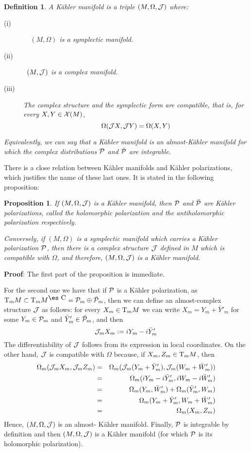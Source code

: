 \documentclass[12pt]{article}
\newtheorem{prop}{Proposition}
\newtheorem{definition}{Definition}
\def\beann{\begin{eqnarray*}}
\def\eeann{\end{eqnarray*}}
\def\qed{\ifvmode\removelastskip\fi
{\unskip\nobreak\hfil\penalty50\hbox{}\nobreak\hfil
\hbox{\vrule height1.2ex width1.2ex}\parfillskip=0pt
\finalhyphendemerits=0 \par\smallskip}}
\def\P{{\cal P}}
\def\Complex{\mbox{\es C}}
\def\Tan{{\rm T}}
\begin{document}
\begin{definition}
A {\rm K\"ahler manifold} is a triple $(M,\Omega ,{\cal J})$ where:
\begin{description}
\item[{\rm (i)}]\ \
$(M,\Omega )$ is a symplectic manifold.
\item[{\rm (ii)}]\
$(M,{\cal J})$ is a complex manifold.
\item[{\rm (iii)}]
The complex structure and the symplectic form
are compatible, that is, for every $X,Y \in {\cal X}(M)$,
$$
\Omega ({\cal J}X,{\cal J}Y) =  \Omega (X,Y)
$$
\end{description}

Equivalently, we can say that a K\"ahler manifold
is an almost-K\"ahler manifold for which
the complex distributions $\P$ and $\bar \P$ are integrable.
\end{definition}

There is a close relation between K\"ahler manifolds
and K\"ahler polarizations,
which justifies the name of these last ones.
It is stated in the following proposition:

\begin{prop}
If $(M,\Omega ,{\cal J})$ is a K\"ahler manifold,
then $\P$ and $\bar \P$ are K\"ahler polarizations,
called the {\rm holomorphic polarization} and
the {\rm antiholomorphic polarization} respectively.

Conversely, if $(M,\Omega)$ is a symplectic manifold
which carries a K\"ahler polarization $\P$,
then there is a complex structure ${\cal J}$ defined in $M$
which is compatible with $\Omega$,
and therefore, $(M,\Omega ,{\cal J})$ is a K\"ahler manifold.
\end{prop}
{\bf Proof}: 
The first part of the proposition is immediate.

For the second one we have that
if $\P$ is a K\"ahler polarization, as
$\Tan_mM \subset \Tan_m M^{\Complex} = \P_m \oplus \bar \P_m$,
then we can define an almost-complex structure ${\cal J}$
as follows: for every $X_m \in \Tan_m M$
we can write $X_m = Y_m + \bar Y'_m$ for some
$Y_m \in \P_m$ and $\bar Y'_m \in \bar \P_m$,
and then
$$
{\cal J}_mX_m := iY_m - i\bar Y'_m
$$
The differentiability of ${\cal J}$ follows from
its expression in local coordinates.
On the other hand, ${\cal J}$ is compatible with $\Omega$
because, if $X_m,Z_m \in \Tan_m M$, then
\beann
\Omega_m ({\cal J}_mX_m,{\cal J}_mZ_m)&=&
\Omega_m ({\cal J}_m(Y_m+\bar Y'_m),{\cal J}_m(W_m+\bar W'_m))\\
&=& \Omega_m (iY_m-i\bar Y'_m,iW_m-i\bar W'_m)
\\
&=&\Omega_m (Y_m,\bar W'_m) + \Omega_m (\bar Y'_m,W_m)\\
&=&\Omega_m (Y_m+\bar Y'_m,W_m+\bar W'_m)\\
&=& \Omega_m (X_m,Z_m)
\eeann
Hence, $(M,\Omega ,{\cal J})$ is an almost- K\"ahler manifold.
Finally, $\P$ is integrable by definition
and then $(M,\Omega ,{\cal J})$ is a K\"ahler manifold
(for which $\P$ is its holomorphic polarization).
\qed
\end{document}
